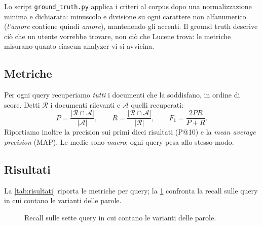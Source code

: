 \documentclass[10pt,a4paper,twocolumn]{article}
\newcommand{\file}[1]{\texttt{#1}}
\begin{document}
Lo script \file{ground\_truth.py} applica i criteri al corpus dopo una normalizzazione minima e dichiarata:
minuscolo e divisione su ogni carattere non alfanumerico (\emph{l'amore} contiene quindi \emph{amore}),
mantenendo gli accenti. Il ground truth descrive ciò che un utente vorrebbe trovare, non ciò che Lucene trova:
le metriche misurano quanto ciascun analyzer vi si avvicina.

\subsection{Metriche}
Per ogni query recuperiamo \emph{tutti} i documenti che la soddisfano, in ordine di score. Detti $\mathcal{R}$ i
documenti rilevanti e $\mathcal{A}$ quelli recuperati:
\[
P=\frac{|\mathcal{R}\cap\mathcal{A}|}{|\mathcal{A}|},\qquad
R=\frac{|\mathcal{R}\cap\mathcal{A}|}{|\mathcal{R}|},\qquad
F_1=\frac{2PR}{P+R}.
\]
Riportiamo inoltre la precision sui primi dieci risultati (P@10) e la \emph{mean average precision} (MAP). Le
medie sono \emph{macro}: ogni query pesa allo stesso modo.

\subsection{Risultati}
La \cref{tab:risultati} riporta le metriche per query; la \cref{fig:recall} confronta la recall sulle query in cui
contano le varianti delle parole.

\begin{figure}[t]
\centering
{}
\caption{Recall sulle sette query in cui contano le varianti delle parole.}
\label{fig:recall}
\end{figure}
\end{document}
